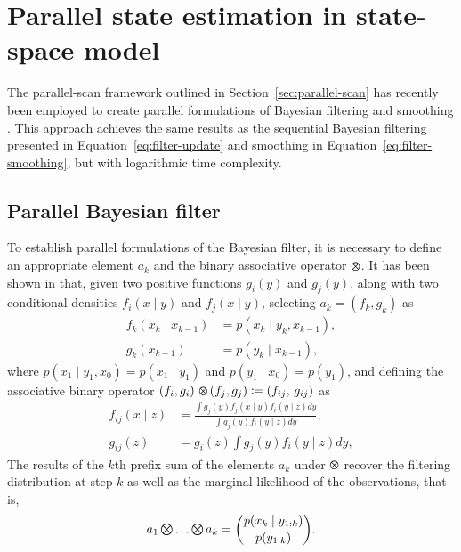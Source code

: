 \documentclass[dissertation,math,vertlayout,pdfa,colorlinks,nologo]{aaltoseries}
\DeclareMathOperator*{\Motimes}{\text{\raisebox{0.25ex}{\scalebox{0.65}{$\bigotimes$}}}}
\begin{document}
\section{Parallel state estimation in state-space model}
The parallel-scan framework outlined in Section~\ref{sec:parallel-scan} has recently been employed to create parallel formulations of Bayesian filtering and smoothing \cite{sarkka2020temporal}. This approach achieves the same results as the sequential Bayesian filtering presented in Equation~\eqref{eq:filter-update} and smoothing in Equation~\eqref{eq:filter-smoothing}, but with logarithmic time complexity.
    \subsection{Parallel Bayesian filter}
        To establish parallel formulations of the Bayesian filter, it is necessary to define an appropriate element $a_k$ and the binary associative operator $\Motimes$. It has been shown in \cite[Definition 2 and Theorem 3]{sarkka2020temporal} that, given two positive functions $g_i(y)$ and $g_j(y)$, along with two conditional densities $f_i(x \mid y)$ and $f_j(x \mid y)$, selecting $a_k = (f_k, g_k)$ as
        \begin{equation}  \label{eq:gen-filter-init}
            \begin{split}
                f_k(x_k \mid x_{k-1}) &= p(x_k \mid y_k, x_{k-1}), \\
                g_k(x_{k-1}) &= p(y_k \mid x_{k-1}),
            \end{split}
        \end{equation}
        where $p(x_1 \mid y_1,x_0) = p(x_1 \mid y_1)$ and $p(y_1 \mid x_0)= p(y_1)$, and defining the associative binary operator $(f_i,g_i) \, \Motimes \, (f_j,g_j) \coloneqq (f_{ij},\, g_{ij})$ as
        \begin{equation} \label{eq:gen-filter-op}
            \begin{split}
                f_{ij}(x \mid z) &= \frac{\int{g_j(y)f_j(x \mid y)}f_i(y\mid z)dy}{\int{g_j(y)}f_i(y \mid z)dy},\\
                g_{ij}(z) &= g_i(z)\int{g_j(y)f_i(y \mid z)dy},
            \end{split}
        \end{equation}
         The results of the $k$th prefix sum of the elements $a_k$ under $\Motimes$ recover the filtering distribution at step $k$ as well as the marginal likelihood of the observations, that is,
        \begin{equation}
        a_1\Motimes \dots \Motimes a_k = \binom{p(x_k \mid y_{1:k})}{p(y_{1:k})}.
        \label{eq:gen-filter-res}
        \end{equation}
\end{document}
